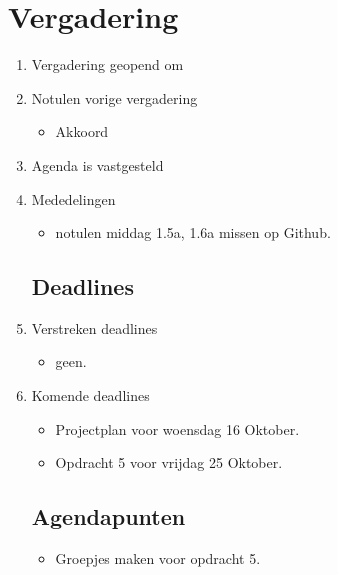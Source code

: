 \documentclass{article}
\begin{document}
\section*{Vergadering}
\begin{enumerate}
	
	\subsection*{Vooraf}
	\item Vergadering geopend om %
	\item Notulen vorige vergadering
	\begin{itemize}
		\item Akkoord
	\end{itemize}
	\item Agenda is vastgesteld
	\item Mededelingen
	\begin{itemize}
		\item notulen middag 1.5a, 1.6a missen op Github.
	\end{itemize}

	\subsection*{Deadlines}
	\item Verstreken deadlines
	\begin{itemize}
		\item geen.
	\end{itemize}
	\item Komende deadlines
	\begin{itemize}
		\item Projectplan voor woensdag 16 Oktober.
		\item Opdracht 5 voor vrijdag 25 Oktober.
	\end{itemize}

	\subsection*{Agendapunten}
	\begin{itemize}
	\item Groepjes maken voor opdracht 5.
	\end{itemize}
	


\end{enumerate}
\end{document}
